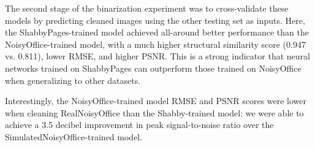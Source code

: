 \documentclass[runningheads]{llncs}
\begin{document}
The second stage of the binarization experiment was to cross-validate these models by predicting cleaned images using the other testing set as inputs.
Here, the ShabbyPages-trained model achieved all-around better performance than the NoisyOffice-trained model, with a much higher structural similarity score (0.947 vs. 0.811), lower RMSE, and higher PSNR.
This is a strong indicator that neural networks trained on ShabbyPages can outperform those trained on NoisyOffice when generalizing to other datasets.

Interestingly, the NoisyOffice-trained model RMSE and PSNR scores were lower when cleaning RealNoisyOffice than the Shabby-trained model: we were able to achieve a 3.5 decibel improvement in peak signal-to-noise ratio over the SimulatedNoisyOffice-trained model.



\end{document}
